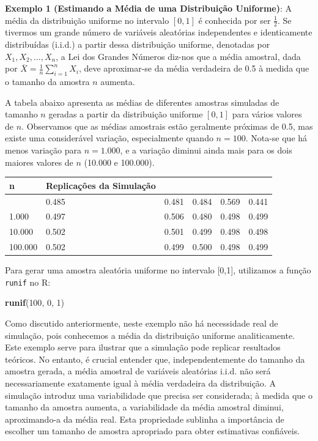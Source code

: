 \documentclass[
]{book}
\newenvironment{Shaded}{\begin{snugshade}}{\end{snugshade}}
\newcommand{\DecValTok}[1]{\textcolor[rgb]{0.00,0.00,0.81}{#1}}
\newcommand{\FunctionTok}[1]{\textcolor[rgb]{0.13,0.29,0.53}{\textbf{#1}}}
\newcommand{\NormalTok}[1]{#1}
\begin{document}
\textbf{Exemplo 1 (Estimando a Média de uma Distribuição Uniforme)}: A média
da distribuição uniforme no intervalo \([0,1]\) é conhecida por ser
\(\frac{1}{2}\). Se tivermos um grande número de variáveis aleatórias
independentes e identicamente distribuídas (i.i.d.) a partir dessa
distribuição uniforme, denotadas por \(X_{1}, X_{2}, \ldots, X_{n}\), a
Lei dos Grandes Números diz-nos que a média amostral, dada por
\(\overline{X} = \frac{1}{n} \sum_{i=1}^{n} X_{i}\), deve aproximar-se da
média verdadeira de 0.5 à medida que o tamanho da amostra \(n\) aumenta.

A tabela abaixo apresenta as médias de diferentes amostras simuladas de
tamanho \(n\) geradas a partir da distribuição uniforme \([0,1]\) para
vários valores de \(n\). Observamos que as médias amostrais estão
geralmente próximas de 0.5, mas existe uma considerável variação,
especialmente quando \(n = 100\). Nota-se que há menos variação para
\(n = 1.000\), e a variação diminui ainda mais para os dois maiores
valores de \(n\) (10.000 e 100.000).

\begin{longtable}[]{@{}llllll@{}}
\toprule\noalign{}
n & Replicações da Simulação & & & & \\
\midrule\noalign{}
\endhead
\bottomrule\noalign{}
\endlastfoot
100 & 0.485 & 0.481 & 0.484 & 0.569 & 0.441 \\
1.000 & 0.497 & 0.506 & 0.480 & 0.498 & 0.499 \\
10.000 & 0.502 & 0.501 & 0.499 & 0.498 & 0.498 \\
100.000 & 0.502 & 0.499 & 0.500 & 0.498 & 0.499 \\
\end{longtable}

Para gerar uma amostra aleatória uniforme no intervalo {[}0,1{]}, utilizamos
a função \texttt{runif} no R:

\begin{Shaded}
\begin{Highlighting}[]
\FunctionTok{runif}\NormalTok{(}\DecValTok{100}\NormalTok{, }\DecValTok{0}\NormalTok{, }\DecValTok{1}\NormalTok{)}
\end{Highlighting}
\end{Shaded}

Como discutido anteriormente, neste exemplo não há necessidade real de
simulação, pois conhecemos a média da distribuição uniforme
analiticamente. Este exemplo serve para ilustrar que a simulação pode
replicar resultados teóricos. No entanto, é crucial entender que,
independentemente do tamanho da amostra gerada, a média amostral de
variáveis aleatórias i.i.d. não será necessariamente exatamente igual à
média verdadeira da distribuição. A simulação introduz uma variabilidade
que precisa ser considerada; à medida que o tamanho da amostra aumenta,
a variabilidade da média amostral diminui, aproximando-a da média real.
Esta propriedade sublinha a importância de escolher um tamanho de
amostra apropriado para obter estimativas confiáveis.
\end{document}
